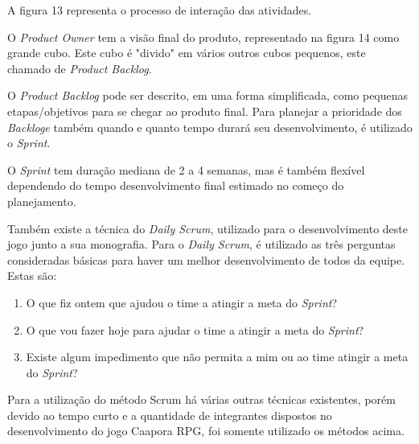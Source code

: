 		A figura 13 representa o processo de interação das atividades.


	\begin{figure}[h!]
		\centering
	\end{figure}
	
O \textit{Product Owner} tem a visão final do produto, representado na figura 14 como grande cubo. Este cubo é "divido" em vários outros cubos pequenos, este chamado de \textit{Product Backlog}.

O \textit{Product Backlog} pode ser descrito, em uma forma simplificada, como pequenas etapas/objetivos para se chegar ao produto final.
Para planejar a prioridade dos \textit{Backloge} também quando e quanto tempo durará seu desenvolvimento, é utilizado o \textit{Sprint}.

O \textit{Sprint} tem duração mediana de 2 a 4 semanas, mas é também flexível dependendo do tempo desenvolvimento final estimado no começo do planejamento.

Também existe a técnica do \textit{Daily Scrum}, utilizado para o desenvolvimento deste jogo junto a sua monografia. Para o \textit{Daily Scrum}, é utilizado as três perguntas consideradas básicas para haver um melhor desenvolvimento de todos da equipe.
Estas são:

\begin{enumerate}
   \item O que fiz ontem que ajudou o time a atingir a meta do \textit{Sprint}?
   \item O que vou fazer hoje para ajudar o time a atingir a meta do \textit{Sprint}?
   \item  Existe algum impedimento que não permita a mim ou ao time atingir a meta do \textit{Sprint}?
 \end{enumerate}
 \cite{scrum}
 
Para a utilização do método Scrum há várias outras técnicas existentes, porém devido ao tempo curto e a quantidade de integrantes dispostos no desenvolvimento do jogo Caapora RPG, foi somente utilizado os métodos acima.

